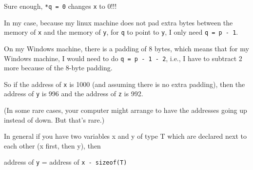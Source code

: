 Sure enough, \texttt{*q = 0} changes \texttt{x} to 0!!!

 In my case, because my linux machine does not pad extra bytes between the memory of \texttt{x} and the memory of \texttt{y}, for \texttt{q} to point to \texttt{y}, I only need \texttt{q = p - 1}.

On my Windows machine, there is a padding of 8 bytes, which means that for my Windows machine, I would need to do \texttt{q = p - 1 - 2}, i.e., I have to subtract 2 more because of the 8-byte padding.

So if the address of \texttt{x} is 1000 (and assuming there is no extra padding), then the address of \texttt{y} is 996 and the address of \texttt{z} is 992.

(In some rare cases, your computer might arrange to have the addresses going up instead of down. But that's rare.)

In general if you have two variables x and y of type T which are declared next to each other (x first, then y), then

address of \texttt{y} = address of \texttt{x - sizeof(T)}






